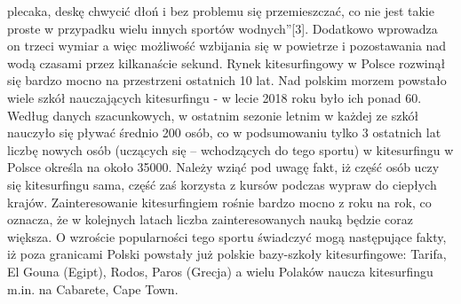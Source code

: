 \documentclass{article}
\begin{document}
\begin{multicols}{2}
plecaka, deskę chwycić dłoń i bez problemu się przemieszczać, co nie jest takie proste w przypadku wielu innych sportów
wodnych”[3].
Dodatkowo wprowadza on trzeci wymiar a więc możliwość wzbijania się w powietrze i pozostawania nad wodą
czasami przez kilkanaście sekund.
Rynek kitesurfingowy w Polsce rozwinął się bardzo mocno na przestrzeni ostatnich 10 lat.
Nad polskim morzem powstało wiele szkół nauczających kitesurfingu - w lecie 2018 roku było ich ponad 60.
Według danych szacunkowych, w ostatnim sezonie letnim w każdej ze szkół nauczyło się pływać średnio 200 osób, co
w podsumowaniu tylko 3 ostatnich lat liczbę nowych osób (uczących się – wchodzących do tego sportu) w kitesurfingu
w Polsce określa na około 35000. Należy wziąć pod uwagę fakt, iż część osób uczy się kitesurfingu sama, część zaś korzysta
z kursów podczas wypraw do ciepłych krajów.
Zainteresowanie kitesurfingiem rośnie bardzo mocno z roku na rok, co oznacza, że w kolejnych latach liczba
zainteresowanych nauką będzie coraz większa.
O wzroście popularności tego sportu świadczyć mogą następujące fakty, iż poza granicami Polski powstały już
polskie bazy-szkoły kitesurfingowe: Tarifa, El Gouna (Egipt), Rodos, Paros (Grecja) a wielu Polaków naucza kitesurfingu m.in.
na Cabarete, Cape Town. ~\cite{wiesner2018zarzkadzanie}
\end{multicols}
	
	\newpage
	\listoffigures
	\listoftables
	
	\newpage
	
	
	
	
	
\end{document}
